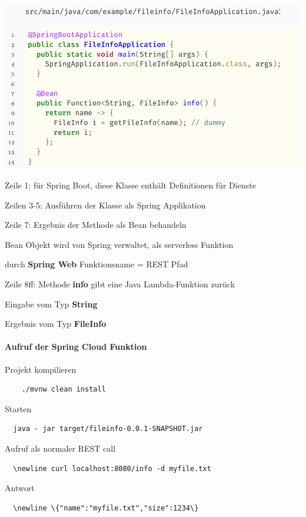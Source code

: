 \documentclass[10pt]{article}
\begin{document}
\begin{center}
  \includegraphics[width=0.4\linewidth]{Assets/Programmierparadigmen-code-snippet-92}
\end{center}
\begin{itemize*}
  \item Zeile 1: für Spring Boot, diese Klasse enthält Definitionen für Dienste
  \item Zeilen 3-5: Ausführen der Klasse als Spring Applikation
  \item Zeile 7: Ergebnis der Methode als Bean behandeln
  \begin{itemize*}
    \item Bean Objekt wird von Spring verwaltet, als serverless Funktion
    \item durch \textbf{Spring Web} Funktionsname = REST Pfad
  \end{itemize*}
  \item Zeile 8ff: Methode \textbf{info} gibt eine Java Lambda-Funktion zurück
  \begin{itemize*}
    \item Eingabe vom Typ \textbf{String}
    \item Ergebnis vom Typ \textbf{FileInfo}
  \end{itemize*}
\end{itemize*}

\paragraph{Aufruf der Spring Cloud Funktion}

\begin{enumerate*}
  \item Projekt kompilieren
  \begin{lstlisting}
    ./mvnw clean install
  \end{lstlisting}
  \item Starten 
  \begin{lstlisting}
  java - jar target/fileinfo-0.0.1-SNAPSHOT.jar
  \end{lstlisting}
  \item Aufruf als normaler REST call
  \begin{lstlisting}
  \newline curl localhost:8080/info -d myfile.txt
  \end{lstlisting}
  \item Antwort
  \begin{lstlisting}
  \newline \{"name":"myfile.txt","size":1234\}
  \end{lstlisting}
\end{enumerate*}
\end{document}

